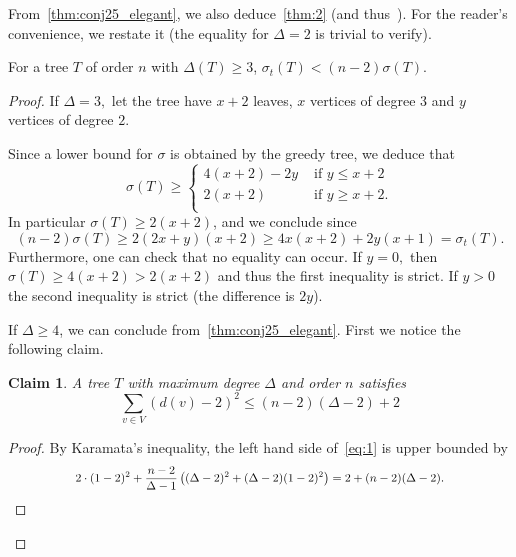 \documentclass[a4paper,11pt]{article}
\newenvironment{customthm}[1]
 {\renewcommand\theinnercustomthm{#1}\innercustomthm}
 {\endinnercustomthm}
\newtheorem{claim}[defi]{Claim}
\newcommand*{\myproofname}{Proof}
\newenvironment{claimproof}[1][\myproofname]{\begin{proof}[#1]\renewcommand*{\qedsymbol}{\(\diamondsuit\)}}{\end{proof}}
\begin{document}
    

From~\cref{thm:conj25_elegant}, we also deduce~\cref{thm:2} (and thus~\cite[Conj.~25]{FDKS24}). For the reader’s convenience, we restate it (the equality for $\Delta=2$ is trivial to verify).

\begin{customthm} {\bf \ref{thm:2}}
    For a tree $T$ of order $n$ with $\Delta(T)\ge3$, $\sigma_t(T)<(n-2) \sigma(T).$
\end{customthm}

\begin{proof}
    If $\Delta=3,$ let the tree have $x+2$ leaves, $x$ vertices of degree $3$ and $y$ vertices of degree $2.$

    Since a lower bound for $\sigma$ is obtained by the greedy tree, we deduce that 
    $$\sigma(T) \ge \begin{cases}
        4(x+2)-2y &\mbox{ if } y \le x+2\\
        2(x+2) &\mbox{ if } y \ge x+2.\\
    \end{cases}$$
    In particular $\sigma(T) \ge 2(x+2)$, and we conclude since $$(n-2)\sigma(T) \ge 2(2x+y)(x+2) \ge 4x(x+2)+2y(x+1)= \sigma_t(T).$$
    Furthermore, one can check that no equality can occur. 
    If $y=0,$ then $\sigma(T) \ge 4(x+2)>2(x+2)$ and thus the first inequality is strict. If $y>0$ the second inequality is strict (the difference is $2y$).

    If $\Delta \ge 4$, we can conclude from~\cref{thm:conj25_elegant}.
    First we notice the following claim.
    \begin{claim}\label{clm:uppbnd_sum(d-2)^2}
        A tree $T$ with maximum degree $\Delta$ and order $n$ satisfies
        \begin{equation}\label{eq:1}
            \sum_{v \in V} ( d(v)-2)^2 \le (n-2)(\Delta-2)+2
        \end{equation}
    \end{claim}
    \begin{claimproof}
        By Karamata's inequality, the left hand side of~\eqref{eq:1} is upper bounded by \begin{align*} \hspace{2cm}2 \cdot (1-2)^2+\frac{n-2}{\Delta-1} \left( (\Delta-2)^2+(\Delta-2)(1-2)^2\right)= 2+(n-2)(\Delta-2). \hspace{2cm} \qedhere \end{align*}
    \end{claimproof}


\end{proof}
\end{document}
